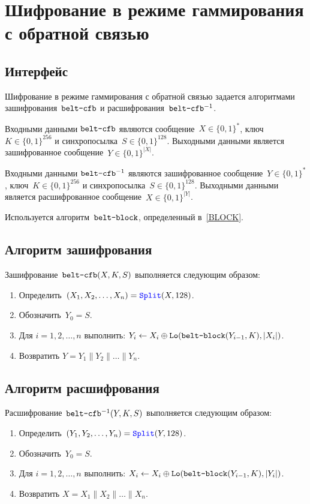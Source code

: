 \section{Шифрование в режиме гаммирования с обратной связью}\label{CFB}

\subsection{Интерфейс}\label{CFB.IFace}

Шифрование в режиме гаммирования с обратной связью задается алгоритмами 
зашифрования~$\texttt{belt-cfb}$ и расшифрования~$\texttt{belt-cfb}^{-1}$.

Входными данными $\texttt{belt-cfb}$ являются сообщение~$X\in\{0,1\}^*$, 
ключ~$K\in\{0,1\}^{256}$ и синхропосылка~$S\in\{0,1\}^{128}$.
%
Выходными данными является зашифрованное сообщение~$Y\in\{0,1\}^{|X|}$.

Входными данными $\texttt{belt-cfb}^{-1}$ являются зашифрованное 
сообщение~$Y\in\{0,1\}^*$, ключ~$K\in\{0,1\}^{256}$ и 
синхропосылка~$S\in\{0,1\}^{128}$. 
%
Выходными данными является расшифрованное сообщение~$X\in\{0,1\}^{|Y|}$.

Используется алгоритм~$\texttt{belt-block}$, определенный в~\ref{BLOCK}.

\subsection{Алгоритм зашифрования}\label{CFB.Encr}

Зашифрование~$\texttt{belt-cfb}(X,K,S)$ выполняется следующим образом: 
\begin{enumerate}
\item
Определить~$(X_1,X_2,\ldots,X_n)=\mathop{\textcolor{blue}{\texttt{Split}}}\nolimits(X, 128)$.
\item
Обозначить~$Y_0=S$.
\item
Для $i=1,2,\ldots,n$ выполнить:
$Y_i\leftarrow X_i\oplus\mathop{\texttt{Lo}}\nolimits(\texttt{belt-block}(Y_{i-1},K), |X_i|)$.
\item
Возвратить
$Y=Y_1\parallel Y_2\parallel\ldots\parallel Y_n$.
\end{enumerate}

\subsection{Алгоритм расшифрования}\label{CFB.Decr}

Расшифрование~$\texttt{belt-cfb}^{-1}(Y,K,S)$ выполняется следующим образом: 
\begin{enumerate}
\item
Определить~$(Y_1,Y_2,\ldots,Y_n)=\mathop{\textcolor{blue}{\texttt{Split}}}\nolimits(Y, 128)$.
\item
Обозначить~$Y_0=S$.
\item
Для $i=1,2,\ldots,n$ выполнить: 
$X_i\leftarrow X_i\oplus\mathop{\texttt{Lo}}\nolimits(\texttt{belt-block}(Y_{i-1},K), |Y_i|)$.
\item
Возвратить
$X=X_1\parallel X_2\parallel\ldots\parallel X_n$.
\end{enumerate}
